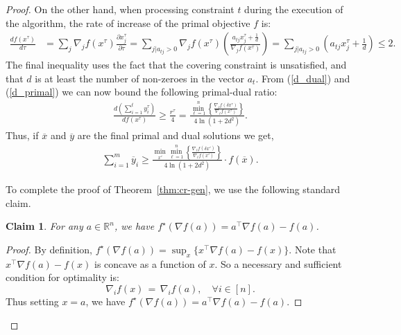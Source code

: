 \documentclass[letterpaper,11pt]{article}
\newtheorem{claim}[thm]{Claim}
\newcommand{\ox}{\ensuremath{\overline{x}}\xspace}
\newcommand{\oy}{\ensuremath{\overline{y}}\xspace}
\newcommand{\trans}{\intercal}
\def\oy{\overline{y}}
\def\ox{\overline{x}}
\begin{document}
\begin{proof}
On the other hand, when processing constraint $t$ during the execution of the algorithm, the rate of increase of the primal objective $f$ is:
\begin{align}
\frac{d f(x^{\tau})}{d\tau} & = \sum_{j} \nabla_j f(x^{\tau}) \frac{\partial x^{\tau}_j}{\partial \tau}  =  \sum_{j | a_{tj}>0}\nabla_j f(x^{\tau}) \left(\frac{a_{tj}x^{\tau}_j + \frac{1}{d}}{\nabla_j f(x^{\tau})}\right) =  \sum_{j | a_{tj}>0}\left( a_{tj}x^{\tau}_j + \frac{1}{d}\right) \leq 2 \label{d_primal}.
\end{align}
The final inequality uses the fact that the covering constraint is unsatisfied, and that $d$ is at least the number of non-zeroes in the vector $a_t$.
From (\ref{d_dual}) and (\ref{d_primal}) we can now bound the following primal-dual ratio:
\begin{align}
\frac{d \left(\sum_{i=1}^{t}y^{\tau}_i\right)}{d f(x^{\tau})} \geq \frac{r^{\tau}}{4} = \frac{\min_{\ell=1}^{n}\left\{\frac{\nabla_\ell f(\delta x^{\tau})}{\nabla_\ell f(x^{\tau})}\right\}}{4\ln\left(1+ 2d^2\right)} \label{ineq:dy_increase}.
\end{align}
Thus, if $\ox$ and $\oy$ are the final primal and dual solutions we get,
\begin{align}
\sum_{i=1}^{m}\oy_i \geq \frac{\min_{x'}\min_{\ell=1}^{n}\left\{\frac{\nabla_\ell f(\delta x')}{\nabla_\ell f(x')}\right\}}{4\ln\left(1+ 2d^2\right)}\cdot f(\ox) \label{ineq:y_increase}.
\end{align}

To complete the proof of Theorem~\ref{thm:cr-gen}, we use the following standard claim. \begin{claim}
  \label{clm:dual-fact}
  For any $a\in \mathbb{R}^n$, we have $f^\star(\nabla f(a)) = a^\trans \nabla f(a) - f(a)$.
\end{claim}
\begin{proof}
By definition, $f^\star(\nabla f(a)) = \sup_x \{ x^\trans  \nabla f(a) -
f(x) \}$. Note that $x^\trans  \nabla f(a) - f(x)$ is concave as a function of $x$. So a necessary and sufficient condition for optimality is:
$$\nabla_i f(x) \,= \, \nabla_i f(a),\quad \forall i\in[n].$$
Thus setting $x=a$, we have $f^\star(\nabla f(a)) = a^\trans \nabla f(a) - f(a)$.
\end{proof}


\end{proof}
\end{document}
